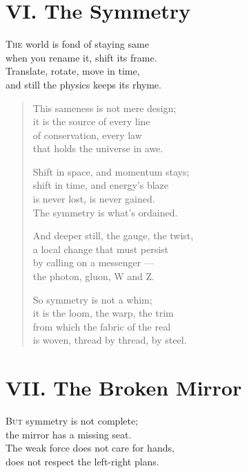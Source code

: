 \documentclass[11pt]{book}
\begin{document}
\section*{VI. The Symmetry}
\lettrine{T}{he} world is fond of staying same\\
when you rename it, shift its frame.\\
Translate, rotate, move in time,\\
and still the physics keeps its rhyme.

\begin{verse}
This sameness is not mere design;\\
it is the source of every line\\
of conservation, every law\\
that holds the universe in awe.

Shift in space, and momentum stays;\\
shift in time, and energy's blaze\\
is never lost, is never gained.\\
The symmetry is what's ordained.

And deeper still, the gauge, the twist,\\
a local change that must persist\\
by calling on a messenger ---\\
the photon, gluon, W and Z.

So symmetry is not a whim;\\
it is the loom, the warp, the trim\\
from which the fabric of the real\\
is woven, thread by thread, by steel.
\end{verse}

\section*{VII. The Broken Mirror}
\lettrine{B}{ut} symmetry is not complete;\\
the mirror has a missing seat.\\
The weak force does not care for hands,\\
does not respect the left-right plans.
\end{document}
